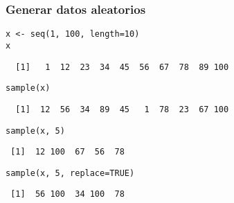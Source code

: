\documentclass{beamer}
\begin{document}
\begin{frame}[fragile]
\frametitle{Generar datos aleatorios}
\label{sec-2-4}



\lstset{language=R}
\begin{lstlisting}
x <- seq(1, 100, length=10)
x
\end{lstlisting}

\begin{verbatim}
  [1]   1  12  23  34  45  56  67  78  89 100
\end{verbatim}


\lstset{language=R}
\begin{lstlisting}
sample(x)
\end{lstlisting}

\begin{verbatim}
  [1]  12  56  34  89  45   1  78  23  67 100
\end{verbatim}


\lstset{language=R}
\begin{lstlisting}
sample(x, 5)
\end{lstlisting}

\begin{verbatim}
 [1]  12 100  67  56  78
\end{verbatim}


\lstset{language=R}
\begin{lstlisting}
sample(x, 5, replace=TRUE)
\end{lstlisting}

\begin{verbatim}
 [1]  56 100  34 100  78
\end{verbatim}
\end{frame}
\end{document}
